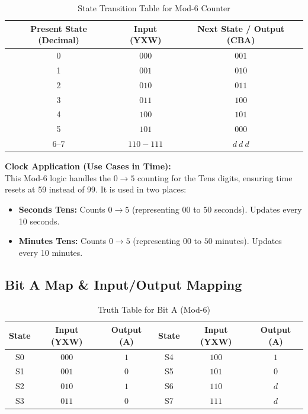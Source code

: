 \documentclass[journal,12pt,onecolumn]{IEEEtran}
\begin{document}
		\begin{table}[H]
			\centering
			\begin{tabular}{|c|c|c|}
				\hline
				\textbf{Present State (Decimal)} & \textbf{Input (YXW)} & \textbf{Next State / Output (CBA)} \\
				\hline
				0 & $000$ & $001$ \\
				\hline
				1 & $001$ & $010$ \\
				\hline
				2 & $010$ & $011$ \\
				\hline
				3 & $011$ & $100$ \\
				\hline
				4 & $100$ & $101$ \\
				\hline
				5 & $101$ & $000$ \\
				\hline
				6--7 & $110-111$ & $d\ d\ d$ \\
				\hline
			\end{tabular}
			\caption{State Transition Table for Mod-6 Counter}
		\end{table}
		
		\begin{justify}
			\textbf{Clock Application (Use Cases in Time):} \\
			This Mod-6 logic handles the $0 \rightarrow 5$ counting for the Tens digits, ensuring time resets at 59 instead of 99. It is used in two places:
			\begin{itemize}
				\item \textbf{Seconds Tens:} Counts $0 \rightarrow 5$ (representing $00$ to $50$ seconds). Updates every 10 seconds.
				\item \textbf{Minutes Tens:} Counts $0 \rightarrow 5$ (representing $00$ to $50$ minutes). Updates every 10 minutes.
			\end{itemize}
		\end{justify}
		
		\vspace{1em}
		\subsection{Bit A Map \& Input/Output Mapping}
		
		\begin{table}[H]
			\centering
			\begin{tabular}{|c|c|c||c|c|c|}
				\hline
				\textbf{State} & \textbf{Input (YXW)} & \textbf{Output (A)} & \textbf{State} & \textbf{Input (YXW)} & \textbf{Output (A)} \\
				\hline
				S0 & $000$ & $1$ & S4 & $100$ & $1$ \\
				\hline
				S1 & $001$ & $0$ & S5 & $101$ & $0$ \\
				\hline
				S2 & $010$ & $1$ & S6 & $110$ & $d$ \\
				\hline
				S3 & $011$ & $0$ & S7 & $111$ & $d$ \\
				\hline
			\end{tabular}
			\caption{Truth Table for Bit A (Mod-6)}
		\end{table}
		
\end{document}
